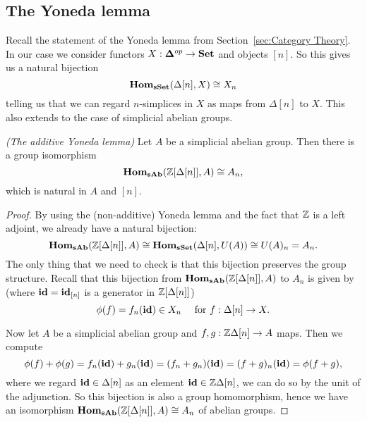 \subsection{The Yoneda lemma}
Recall the statement of the Yoneda lemma from Section~\ref{sec:Category Theory}. In our case we consider functors $X: \mathbf{\Delta}^{op} \to \mathbf{Set}$ and objects $[n]$. So this gives us a natural bijection
$$ \mathbf{Hom}_{\mathbf{sSet}}(\Delta[n], X) \cong X_n $$
telling us that we can regard $n$-simplices in $X$ as maps from $\Delta[n]$ to $X$. This also extends to the case of simplicial abelian groups.
\begin{lemma}\emph{(The additive Yoneda lemma)}
	Let $A$ be a simplicial abelian group. Then there is a group isomorphism
	$$ \mathbf{Hom}_{\mathbf{sAb}}(\mathbb{Z}[\Delta[n]], A) \cong A_n, $$
	which is natural in $A$ and $[n]$.
\end{lemma}
\begin{proof}
	By using the (non-additive) Yoneda lemma and the fact that $\mathbb{Z}$ is a left adjoint, we already have a natural bijection:
	$$ \mathbf{Hom}_{\mathbf{sAb}}(\mathbb{Z}[\Delta[n]], A) \cong \mathbf{Hom}_{\mathbf{sSet}}(\Delta[n], U(A)) \cong U(A)_n = A_n. $$
	The only thing that we need to check is that this bijection preserves the group structure. Recall that this bijection from $\mathbf{Hom}_{\mathbf{sAb}}(\mathbb{Z}[\Delta[n]], A)$ to $A_n$ is given by (where $\mathbf{id} = \mathbf{id}_{[n]}$ is a generator in $\mathbb{Z}[\Delta[n]]$)
	$$ \phi(f) = f_n(\mathbf{id}) \in X_n \quad\text{ for } f: \Delta[n] \to X. $$

	Now let $A$ be a simplicial abelian group and $f, g: \mathbb{Z}\Delta[n] \to A$ maps. Then we compute
	$$ \phi(f) + \phi(g) = f_n(\mathbf{id}) + g_n(\mathbf{id}) = (f_n + g_n)(\mathbf{id}) = (f+g)_n(\mathbf{id}) = \phi(f+g), $$
	where we regard $\mathbf{id} \in \Delta[n]$ as an element $\mathbf{id} \in \mathbb{Z}\Delta[n]$, we can do so by the unit of the adjunction. So this bijection is also a group homomorphism, hence we have an isomorphism $\mathbf{Hom}_{\mathbf{sAb}}(\mathbb{Z}[\Delta[n]], A) \cong A_n$ of abelian groups.
\end{proof}
